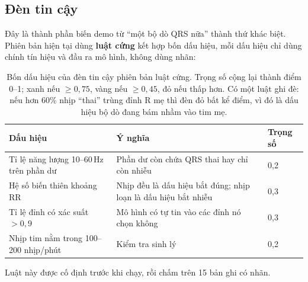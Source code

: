 \subsection{Đèn tin cậy}

Đây là thành phần biến demo từ ``một bộ dò QRS nữa'' thành thứ khác biệt. Phiên bản hiện tại dùng
\textbf{luật cứng} kết hợp bốn dấu hiệu, mỗi dấu hiệu chỉ dùng chính tín hiệu và đầu ra mô hình, không
dùng nhãn:

\begin{table}[H]\centering\small
\caption{Bốn dấu hiệu của đèn tin cậy phiên bản luật cứng. Trọng số cộng lại thành điểm 0--1; xanh nếu
$\geq 0{,}75$, vàng nếu $\geq 0{,}45$, đỏ nếu thấp hơn. Có một luật ghi đè: nếu hơn 60\% nhịp ``thai''
trùng đỉnh R mẹ thì đèn đỏ bất kể điểm, vì đó là dấu hiệu bộ dò đang bám nhầm vào tim mẹ.}
\label{tab:dentincay}
\begin{tabular}{@{}L{4.6cm} L{6.6cm} C{1.6cm}@{}}
\toprule
\textbf{Dấu hiệu} & \textbf{Ý nghĩa} & \textbf{Trọng số} \\
\midrule
Tỉ lệ năng lượng 10--60\,Hz trên phần dư & Phần dư còn chứa QRS thai hay chỉ còn nhiễu & 0,2 \\
Hệ số biến thiên khoảng RR & Nhịp đều là dấu hiệu bắt đúng; nhịp loạn là dấu hiệu bắt nhiễu & 0,3 \\
Tỉ lệ đỉnh có xác suất $> 0{,}9$ & Mô hình có tự tin vào các đỉnh nó chọn không & 0,3 \\
Nhịp tim nằm trong 100--200 nhịp/phút & Kiểm tra sinh lý & 0,2 \\
\bottomrule
\end{tabular}
\end{table}

Luật này được cố định trước khi chạy, rồi chấm trên 15 bản ghi có nhãn.

